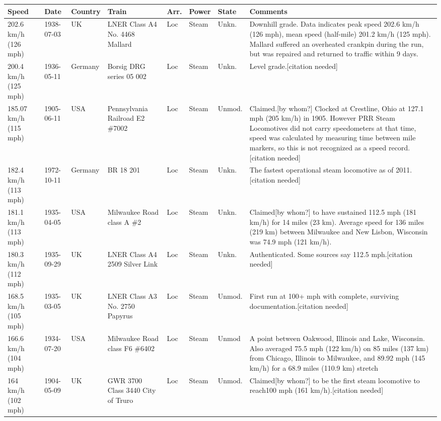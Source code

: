 \documentclass{article}
\begin{document}
\begin{tabular}{llllllll}
\toprule
Speed & Date & Country & Train & Arr. & Power & State & Comments \\
\midrule
202.6 km/h (126 mph) & 1938-07-03 & UK & LNER Class A4 No. 4468 Mallard & Loc & Steam & Unkn. & Downhill grade. Data indicates peak speed 202.6 km/h (126 mph), mean speed (half-mile) 201.2 km/h (125 mph). Mallard suffered an overheated crankpin during the run, but was repaired and returned to traffic within 9 days. \\
200.4 km/h (125 mph) & 1936-05-11 & Germany & Borsig DRG series 05 002 & Loc & Steam & Unkn. & Level grade.[citation needed] \\
185.07 km/h (115 mph) & 1905-06-11 & USA & Pennsylvania Railroad E2 \#7002 & Loc & Steam & Unmod. & Claimed.[by whom?] Clocked at Crestline, Ohio at 127.1 mph (205 km/h) in 1905. However PRR Steam Locomotives did not carry speedometers at that time, speed was calculated by measuring time between mile markers, so this is not recognized as a speed record.[citation needed] \\
182.4 km/h (113 mph) & 1972-10-11 & Germany & BR 18 201 & Loc & Steam & Unkn. & The fastest operational steam locomotive as of 2011.[citation needed] \\
181.1 km/h (113 mph) & 1935-04-05 & USA & Milwaukee Road class A \#2 & Loc & Steam & Unkn. & Claimed[by whom?] to have sustained 112.5 mph (181 km/h) for 14 miles (23 km). Average speed for 136 miles (219 km) between Milwaukee and New Lisbon, Wisconsin was 74.9 mph (121 km/h). \\
180.3 km/h (112 mph) & 1935-09-29 & UK & LNER Class A4 2509 Silver Link & Loc & Steam & Unkn. & Authenticated. Some sources say 112.5 mph.[citation needed] \\
168.5 km/h (105 mph) & 1935-03-05 & UK & LNER Class A3 No. 2750 Papyrus & Loc & Steam & Unmod. & First run at 100+ mph with complete, surviving documentation.[citation needed] \\
166.6 km/h (104 mph) & 1934-07-20 & USA & Milwaukee Road class F6 \#6402 & Loc & Steam & Unmod & A point between Oakwood, Illinois and Lake, Wisconsin. Also averaged 75.5 mph (122 km/h) on 85 miles (137 km) from Chicago, Illinois to Milwaukee, and 89.92 mph (145 km/h) for a 68.9 miles (110.9 km) stretch \\
164 km/h (102 mph) & 1904-05-09 & UK & GWR 3700 Class 3440 City of Truro & Loc & Steam & Unmod. & Claimed[by whom?] to be the first steam locomotive to reach100 mph (161 km/h).[citation needed] \\

\end{tabular}
\end{document}
